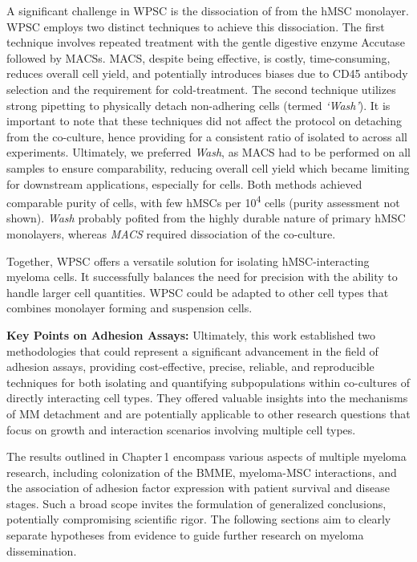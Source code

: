A significant challenge in \ac{WPSC} is the dissociation of \MAina from the hMSC
monolayer. WPSC employs two distinct techniques to achieve this dissociation.
The first technique involves repeated treatment with the gentle digestive enzyme
Accutase followed by \acp{MACS}. \ac{MACS}, despite being effective, is costly,
time-consuming, reduces overall cell yield, and potentially introduces biases
due to CD45 antibody selection and the requirement for cold-treatment. The
second technique utilizes strong pipetting to physically detach non-adhering
cells (termed \emph{`Wash'}). It is important to note that these techniques did
not affect the protocol on detaching \nMAina from the co-culture, hence
providing for a consistent ratio of isolated \MAina to \nMAina across all
experiments. Ultimately, we preferred \emph{Wash}, as \ac{MACS} had to be
performed on all samples to ensure comparability, reducing overall cell yield
which became limiting for downstream applications, especially for \nMAina cells.
Both methods achieved comparable purity of \MAina cells, with few hMSCs per
10\textsuperscript{4} \MAina cells (purity assessment not shown). \emph{Wash}
probably pofited from the highly durable nature of primary hMSC monolayers,
whereas \emph{MACS} required dissociation of the co-culture.

Together, \ac{WPSC} offers a versatile solution for isolating hMSC-interacting
myeloma cells. It successfully balances the need for precision with the ability
to handle larger cell quantities. \ac{WPSC} could be adapted to other cell types
that combines monolayer forming and suspension cells.



\textbf{Key Points on Adhesion Assays:} Ultimately, this work established two
methodologies that could represent a significant advancement in the field of
adhesion assays, providing cost-effective, precise, reliable, and reproducible
techniques for both isolating and quantifying subpopulations within co-cultures
of directly interacting cell types. They offered valuable insights into the
mechanisms of MM detachment and are potentially applicable to other research
questions that focus on growth and interaction scenarios involving multiple cell
types.






\newpage %

%
\label{sec:discussion_framework}%
The results outlined in Chapter\,1 encompass various aspects of multiple myeloma
research, including colonization of the \ac{BMME}, myeloma-\ac{MSC}
interactions, and the association of adhesion factor%
\footterm{\footadhesionfactor}{\label{foot:adhesionfactor}}%
expression with patient survival and disease stages. Such a broad scope invites
the formulation of generalized conclusions, potentially compromising scientific
rigor. The following sections aim to clearly separate hypotheses from evidence
to guide further research on myeloma dissemination.


